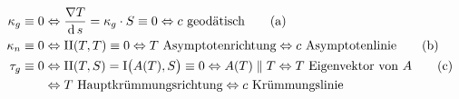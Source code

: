 \begin{beweis}
 \begin{align*}
  \kappa_g \equiv 0 &\Leftrightarrow \frac{\nabla T}{\dd s} = \kappa_g \cdot S \equiv 0 \Leftrightarrow c \text{ geodätisch} \tag{a} \\
  \kappa_n \equiv 0 &\Leftrightarrow \Rom2(T,T) \equiv 0 \Leftrightarrow T \text{ Asymptotenrichtung} \Leftrightarrow c \text{ Asymptotenlinie} \tag{b} \\
  \tau_g \equiv 0 &\Leftrightarrow \Rom2(T,S) = \Rom1 \big(A(T),S\big) \equiv 0 \Leftrightarrow A(T) \parallel T \Leftrightarrow T \text{ Eigenvektor von }A \tag{c} \\
  &\Leftrightarrow T \text{ Hauptkrümmungsrichtung} \Leftrightarrow c \text{ Krümmungslinie} 
 \end{align*}
\end{beweis}

